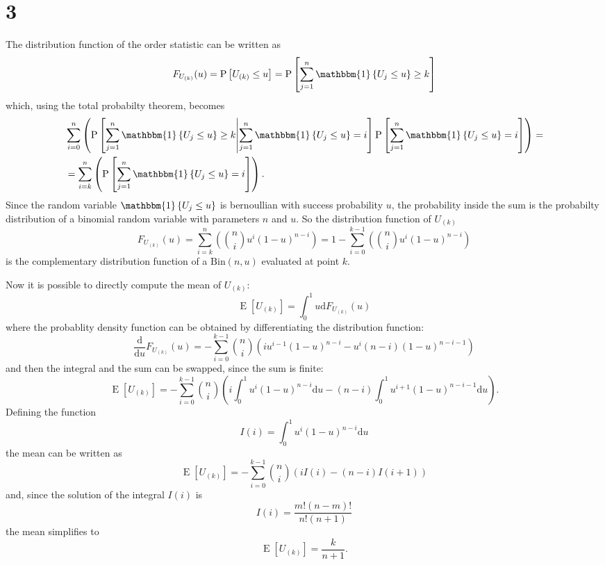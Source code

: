 \documentclass{article}
\newcommand{\E}[1]{\operatorname{E}\left[#1\right]}
\newcommand{\Prob}[1]{\operatorname{P}\left[#1\right]}
\newcommand{\ProbC}[2]{\operatorname{P}\left[#1\middle|#2\right]}
\newcommand{\ind}[1]{\operatorname{\mathbbm{1}}\left\{#1\right\}}
\begin{document}
\section*{3}
The distribution function of the order statistic can be written as
\[ F_{U_{(k)}}(u) = \Prob{U_{(k)} \leq u} = \Prob{\sum_{j=1}^n\ind{U_j \leq u} \geq k} \]
which, using the total probabilty theorem, becomes
\begin{align*}
  & \sum_{i=0}^n\left(\ProbC{\sum_{j=1}^n\ind{U_j \leq u} \geq k}{\sum_{j=1}^n\ind{U_j \leq u} = i}\Prob{\sum_{j=1}^n\ind{U_j \leq u} = i}\right) = \\
  &= \sum_{i=k}^n\left( \Prob{\sum_{j=1}^n\ind{U_j \leq u} = i} \right) . 
\end{align*}
Since the random variable $\ind{U_j \leq u}$ is bernoullian with
success probability $u$, the probability inside the sum is the
probabilty distribution of a binomial random variable with parameters
$n$ and $u$. So the distribution function of $U_{(k)}$
\[  F_{U_{(k)}}(u) = \sum_{i=k}^n\left(\binom{n}{i}u^i(1-u)^{n-i}\right)
= 1 - \sum_{i=0}^{k-1}\left(\binom{n}{i}u^i(1-u)^{n-i}\right) \]
is the complementary distribution function of a
$\mathrm{Bin}(n,u)$ evaluated at point $k$.

Now it is possible to directly compute the mean of $U_{(k)}$:
\[ \E{U_{(k)}} = \int_0^1 u \mathrm{d} F_{U_{(k)}}(u) \]
where the probablity density function can be obtained by
differentiating the distribution function:
\[ \frac{\mathrm{d}}{\mathrm{d}u} F_{U_{(k)}}(u) =
- \sum_{i=0}^{k-1}\binom{n}{i}\left( iu^{i-1}(1-u)^{n-i} - u^i(n-i)(1-u)^{n-i-1} \right) \]
and then the integral and the sum can be swapped, since the sum is finite:
\[ \E{U_{(k)}} = -\sum_{i=0}^{k-1}\binom{n}{i}\left( i\int_0^1u^i(1-u)^{n-i}\mathrm{d}u - (n-i)\int_0^1u^{i+1}(1-u)^{n-i-1}\mathrm{d}u \right) . \]
Defining the function
\[ I(i) = \int_0^1u^i(1-u)^{n-i} \mathrm{d}u \]
the mean can be written as
\[ \E{U_{(k)}} = -\sum_{i=0}^{k-1}\binom{n}{i}\left( iI(i) - (n-i)I(i+1) \right) \]
and, since the solution of the integral $I(i)$ is
\[ I(i) = \frac{m!(n-m)!}{n!(n+1)} \]
the mean simplifies to
\[ \E{U_{(k)}} = \frac{k}{n+1} . \]
\end{document}

